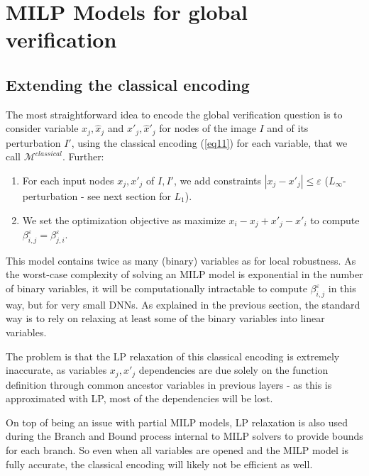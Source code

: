 	\section{MILP Models for global verification}
	
	
	
	\subsection{Extending the classical encoding}
	
    The most straightforward idea to encode the global verification question is to 
    consider variable $x_j,\hat{x}_j$ and $x'_j,\hat{x}'_j$ for nodes of the image $I$ and of its perturbation $I'$,
    using the classical encoding (\ref{eq11}) \cite{MILP} for each variable, 
    that we call $\mathcal{M}^{classical}$.
    Further:
    \begin{enumerate}
		\item For each input nodes $x_j,x'_j$ of $I,I'$, we add constraints
        $|x_j-x'_j| \leq \varepsilon$ 
        ($L_\infty$-perturbation - see next section for $L_1$).
		\item We set the optimization objective as maximize $x_i - x_j +x'_j - x'_i$ to compute $\beta^\varepsilon_{i,j}=\beta^\varepsilon_{j,i}$.
	\end{enumerate}

	This model contains twice as many (binary) variables as for local robustness. As the worst-case complexity of solving an MILP model 
    is exponential in the number of binary variables, it will be computationally intractable to compute $\beta^\varepsilon_{i,j}$ in this way, but for very small DNNs. As explained in the previous section, the standard way is to rely on relaxing at least some of the binary variables into linear variables.

    The problem is that the LP relaxation of this classical encoding is extremely inaccurate, as variables $x_j,x'_j$ dependencies are due solely on the function definition through common ancestor variables in previous layers - as this is approximated with LP, most of the dependencies will be lost.

    On top of being an issue with partial MILP models, LP relaxation is also used during the Branch and Bound process internal to MILP solvers to provide bounds for each branch. So even when all variables are opened and the MILP model is fully accurate, the classical encoding will likely not be efficient as well. 

